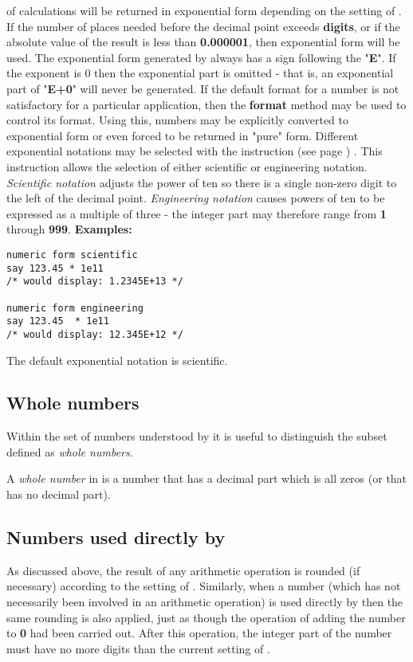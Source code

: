 of calculations will be returned in exponential form depending on the
setting of .
If the number of places needed before the decimal point
exceeds \textbf{digits}, or if the absolute value of the result is
less than \textbf{0.000001}, then exponential form will be used.
The exponential form generated by \nr{} always has a sign following the
"\textbf{E}".
If the exponent is 0 then the exponential part is omitted - that
is, an exponential part of "\textbf{E+0}" will never be
generated.
 If the default format for a number is not satisfactory for a
particular application, then the \textbf{format} method may be used to
control its format.  Using this, numbers may be explicitly converted to
exponential form or even forced to be returned in "pure" form.
\label{refnfo2}
 Different exponential notations may be selected with the
  instruction (see page \pageref{refnform}) .
This instruction allows the selection of either scientific or
engineering notation.
\emph{Scientific notation} adjusts the power of ten so there is a
single non-zero digit to the left of the decimal point.
\emph{Engineering notation} causes powers of ten to be expressed as a
multiple of three - the integer part may therefore range
from \textbf{1} through \textbf{999}.
 \textbf{Examples:}
\begin{lstlisting}
numeric form scientific
say 123.45 * 1e11
/* would display: 1.2345E+13 */

numeric form engineering
say 123.45  * 1e11
/* would display: 12.345E+12 */
\end{lstlisting}
 The default exponential notation is scientific.
\subsection{Whole numbers}\label{refwholed}
 Within the set of numbers understood by \nr{} it is useful to
distinguish the subset defined as \emph{whole numbers}.
 
A \emph{whole number} in \nr{} is a number that has a decimal part
which is all zeros (or that has no decimal part).
\subsection{Numbers used directly by \nr{}}\label{refnumuse}
 As discussed above, the result of any arithmetic operation is
rounded (if necessary) according to the setting of .
Similarly, when a number (which has not necessarily been involved in an
arithmetic operation) is used directly by \nr{} then the same rounding
is also applied, just as though the operation of adding the number
to \textbf{0} had been carried out.
After this operation, the integer part of the number must have no more
digits than the current setting of .
 
